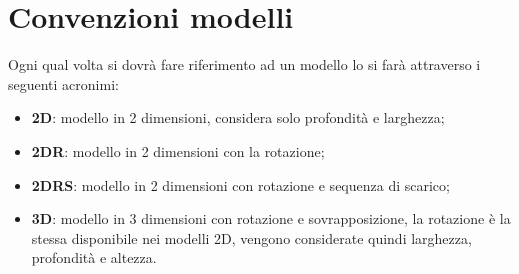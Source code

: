 \section{Convenzioni modelli}
Ogni qual volta si dovrà fare riferimento ad un modello lo si farà attraverso i seguenti acronimi:
\begin{itemize}
	\item \textbf{2D}: modello in 2 dimensioni, considera solo profondità e larghezza;
	\item \textbf{2DR}: modello in 2 dimensioni con la rotazione;
	\item \textbf{2DRS}: modello in 2 dimensioni con rotazione e sequenza di scarico;
	\item \textbf{3D}: modello in 3 dimensioni con rotazione e sovrapposizione, la rotazione è la stessa disponibile nei modelli 2D, vengono considerate quindi larghezza, profondità e altezza.
\end{itemize}